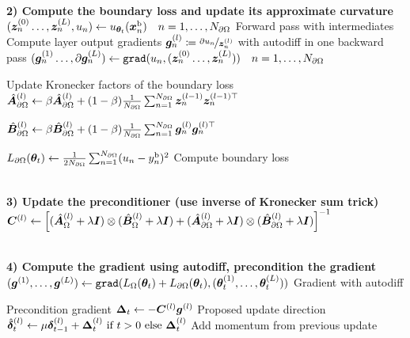 \begin{algorithm}[!h]
\begin{small}
\begin{algorithmic}
        \\
        \State \textbf{2) Compute the boundary loss and update its approximate curvature}
        \State $({\bm{z}}_n^{(0)}\dots, {\bm{z}}_n^{(L)}, u_n) \gets u_{{\bm{\theta}}_t}({\bm{x}}_n^{\text{b}})\quad n=1, \dots, N_{\partial\Omega}$ \Comment Forward pass with intermediates
        \State Compute layer output gradients ${\bm{g}}_n^{(l)} \coloneqq \nicefrac{\partial u_n}{{\bm{z}}^{(l)}_n}$ with autodiff in one backward pass
        \State $({\bm{g}}_n^{(1)}\dots, \partial{\bm{g}}_n^{(L)}) \gets \texttt{grad}(u_n, ({\bm{z}}_n^{(0)}\dots, {\bm{z}}_n^{(L)}))\quad n=1, \dots, N_{\partial\Omega}$

         \Comment Update Kronecker factors of the boundary loss
          \State $\hat{{\bm{A}}}_{\partial\Omega}^{(l)} \gets \beta \hat{{\bm{A}}}_{\partial\Omega}^{(l)} + (1-\beta) \frac1{N_{\partial\Omega}} \sum_{n=1}^{N_{\partial\Omega}} {\bm{z}}_n^{(l-1)} {\bm{z}}_n^{(l-1)\top}$

          \State $\hat{{\bm{B}}}_{\partial\Omega}^{(l)} \gets \beta \hat{{\bm{B}}}_{\partial\Omega}^{(l)} + (1-\beta) \frac1{N_{\partial\Omega}} \sum_{n=1}^{N_{\partial\Omega}} {\bm{g}}_n^{(l)} {\bm{g}}_n^{(l)\top}$
        \EndFor

        \State $L_{\partial\Omega}({\bm{\theta}}_t) \gets \frac{1}{2 N_{\partial\Omega}}\sum_{n=1}^{N_{\partial\Omega}} (u_n - y^{\text{b}}_n)^2$ \Comment Compute boundary loss

        \\
        \State \textbf{3) Update the preconditioner (use inverse of Kronecker sum trick)}
          \State $ {\bm{C}}^{(l)} \gets \left[(\hat{{\bm{A}}}_{\Omega}^{(l)} + \lambda {\bm{I}}) \otimes (\hat{{\bm{B}}}_{\Omega}^{(l)} + \lambda {\bm{I}}) + (\hat{{\bm{A}}}_{\partial\Omega}^{(l)} + \lambda {\bm{I}}) \otimes (\hat{{\bm{B}}}_{\partial\Omega}^{(l)} + \lambda {\bm{I}})  \right]^{-1}$
        \EndFor

        \\
        \State \textbf{4) Compute the gradient using autodiff, precondition the gradient}
        \State $({\bm{g}}^{(1)}, \dots, {\bm{g}}^{(L)}) \gets \texttt{grad}( L_{\Omega}({\bm{\theta}}_t) + L_{\partial\Omega}({\bm{\theta}}_t), ({\bm{\theta}}_t^{(1)}, \dots, {\bm{\theta}}^{(L)}_t ))$ \Comment Gradient with autodiff

          \Comment Precondition gradient
          \State ${\bm{\Delta}}_t \gets - {\bm{C}}^{(l)} {\bm{g}}^{(l)}$ \Comment Proposed update direction
          \State $\hat{{\bm{\delta}}}_t^{(l)} \gets \mu {\bm{\delta}}_{t-1}^{(l)} + {\bm{\Delta}}_t^{(l)} \text{ if $t>0$ else } {\bm{\Delta}}_t^{(l)}$ \Comment Add momentum from previous update
        \EndFor


\end{algorithmic}
\end{small}
\end{algorithm}
